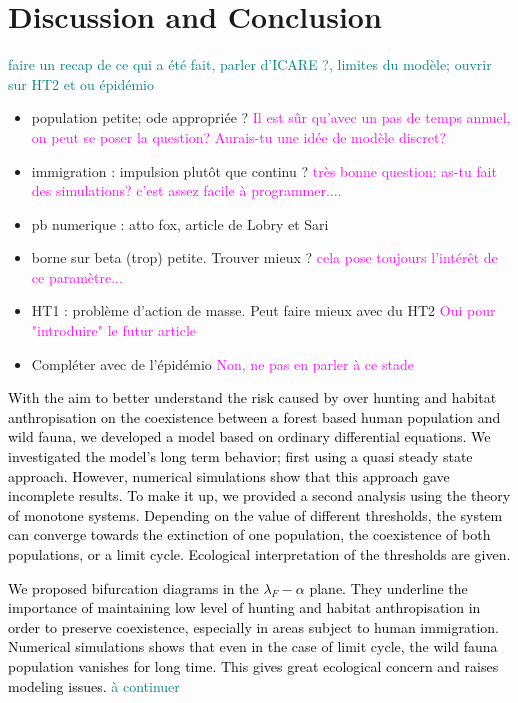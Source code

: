 \documentclass{article}
\newcommand{\lfw}{\lambda_{F}}
\newcommand{\lfw}{\lambda_{F}}
\newcommand{\marc}[1]{\textcolor{teal}{#1}}
\newcommand{\YD}[1]{\textcolor{magenta}{#1}}
\newcommand{\vtrois}[1]{\textcolor{black}{#1}}
\theoremstyle{definition}
\theoremstyle{remark}
\begin{document}
\section{Discussion and Conclusion} \label{sec:conclusion}

\marc{faire un recap de ce qui a été fait, parler d'ICARE ?, limites du modèle; ouvrir sur HT2 et ou épidémio}

\begin{itemize}
\item population petite; ode appropriée ? \YD{Il est sûr qu'avec un pas de temps annuel, on peut se poser la question? Aurais-tu une idée de modèle discret?}
\item immigration : impulsion plutôt que continu ? \YD{très bonne question: as-tu fait des simulations? c'est assez facile à programmer....}
\item pb numerique : atto fox, article de Lobry et Sari
\item borne sur beta (trop) petite. Trouver mieux ? \YD{cela pose toujours l'intérêt de ce paramètre...}
\item HT1 : problème d'action de masse. Peut faire mieux avec du HT2 \YD{Oui pour "introduire" le futur article}
\item Compléter avec de l'épidémio \YD{Non, ne pas en parler à ce stade}
\end{itemize}

\vtrois{
With the aim to better understand the risk caused by over hunting and habitat anthropisation on the coexistence between a forest based human population and wild fauna, we developed a model based on ordinary differential equations. We investigated the model's long term behavior;  first using a quasi steady state approach. However, numerical simulations show that this approach gave incomplete results. To make it up, we provided a second analysis using the theory of monotone systems. Depending on the value of different thresholds, the system can converge towards the extinction of one population, the coexistence of both populations, or a limit cycle. Ecological interpretation of the thresholds are given.
}

\vtrois{
We proposed bifurcation diagrams in the $\lfw-\alpha$ plane. They underline the importance of maintaining low level of hunting and habitat anthropisation in order to preserve coexistence, especially in areas subject to human immigration. Numerical simulations shows that even in the case of limit cycle, the wild fauna population vanishes for long time. This gives great ecological concern and raises modeling issues.
}
\marc{à continuer}
\end{document}
